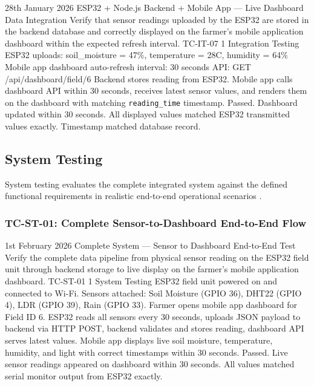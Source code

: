 \testcase%
{28th January 2026}%
{ESP32 + Node.js Backend + Mobile App --- Live Dashboard
Data Integration}%
{Verify that sensor readings uploaded by the ESP32 are
stored in the backend database and correctly displayed on
the farmer's mobile application dashboard within the
expected refresh interval.}%
{TC-IT-07}%
{1}%
{Integration Testing}%
{ESP32 uploads: soil\_moisture = 47\%,
temperature = 28\textdegree{}C, humidity = 64\% \newline
Mobile app dashboard auto-refresh interval: 30 seconds
\newline
API: GET /api/dashboard/field/6}%
{Backend stores reading from ESP32. Mobile app calls
dashboard API within 30 seconds, receives latest sensor
values, and renders them on the dashboard with matching
\texttt{reading\_time} timestamp.}%
{Passed. Dashboard updated within 30 seconds. All displayed
values matched ESP32 transmitted values exactly. Timestamp
matched database record.}

\subsection{System Testing}

System testing evaluates the complete integrated system
against the defined functional requirements in realistic
end-to-end operational scenarios \cite{jaliyagoda2023iot,
sommerville2016software}.

\subsubsection{TC-ST-01: Complete Sensor-to-Dashboard End-to-End Flow}

\testcase%
{1st February 2026}%
{Complete System --- Sensor to Dashboard End-to-End Test}%
{Verify the complete data pipeline from physical sensor
reading on the ESP32 field unit through backend storage
to live display on the farmer's mobile application
dashboard.}%
{TC-ST-01}%
{1}%
{System Testing}%
{ESP32 field unit powered on and connected to Wi-Fi.
\newline
Sensors attached: Soil Moisture (GPIO 36), DHT22 (GPIO 4),
LDR (GPIO 39), Rain (GPIO 33). \newline
Farmer opens mobile app dashboard for Field ID 6.}%
{ESP32 reads all sensors every 30 seconds, uploads JSON
payload to backend via HTTP POST, backend validates and
stores reading, dashboard API serves latest values. Mobile
app displays live soil moisture, temperature, humidity, and
light with correct timestamps within 30 seconds.}%
{Passed. Live sensor readings appeared on dashboard within
30 seconds. All values matched serial monitor output from
ESP32 exactly.}

